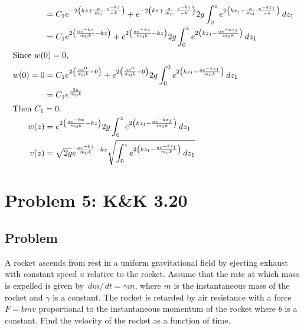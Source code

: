\documentclass[solutions]{esg8012pset}
\renewcommand{\d}{\,d}
\begin{document}
\begin{enumerate}[a)]
\begin{align*}
    & = C_1 e^{-2\left( k z + \frac{a}{m_0} \cdot \frac{e^{-k z}}{-k}\right)} + e^{-2\left( k z + \frac{a}{m_0}\cdot \frac{e^{-k z}}{-k}\right)} 2g\int_0^z e^{2\left(k z_1 + \frac{a}{m_0}\cdot \frac{e^{-k z_1}}{-k}\right)} \d z_1 \\
    & = C_1 e^{2\left(\frac{a e^{-k z}}{m_0 k} -  k z\right)} + e^{2\left(\frac{a e^{-k z}}{m_0 k} - k z\right)} 2g\int_0^z e^{2\left(k z_1 - \frac{a e^{-k z_1}}{m_0 k}\right)} \d z_1 \\
    \intertext{Since $w(0) = 0$,}
   w(0) = 0 & = C_1 e^{2\left(\frac{a e^{0}}{m_0 k} -  0 \right)} + e^{2\left(\frac{a e^{0}}{m_0 k} - 0\right)} 2g\int_0^0 e^{2\left(k z_1 - \frac{a e^{-k z_1}}{m_0 k}\right)} \d z_1 \\
    & = C_1 e^{\frac{2a}{m_0 k}}\\
   \intertext{Then $C_1 = 0$.}
   w(z) & = e^{2\left(\frac{a e^{-k z}}{m_0 k} - k z\right)} 2g\int_0^z e^{2\left(k z_1 - \frac{a e^{-k z_1}}{m_0 k}\right)} \d z_1 \\
   v(z) & = \sqrt{2g}e^{\frac{a e^{-k z}}{m_0 k} - k z} \sqrt{\int_0^z e^{2\left(k z_1 - \frac{a e^{-k z_1}}{m_0 k}\right)} \d z_1} \\
  \end{align*}%
  \end{enumerate}
\section*{Problem 5: K\&K 3.20}
\subsection*{Problem}
  A rocket ascends from rest in a uniform gravitational field by ejecting exhaust with constant speed $u$ relative to the rocket. Assume that the rate at which mass is expelled is given by $\d m / \d t = \gamma m$, where $m$ is the instantaneous mass of the rocket and $\gamma$ is a constant. The rocket is retarded by air resistance with a force $F = b m v$ proportional to the instantaneous momentum of the rocket where $b$ is a constant. Find the velocity of the rocket as a function of time.
\end{document}

